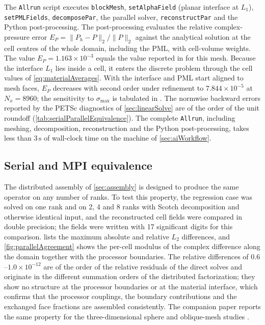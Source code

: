 \documentclass[final,12pt,nopreprintline]{elsarticle}
\newcommand{\code}[1]{\texttt{#1}}
\begin{document}
The \code{Allrun} script executes \code{blockMesh}, \code{setAlphaField}
(planar interface at $L_1$), \code{setPMLFields}, \code{decomposePar}, the
parallel solver, \code{reconstructPar} and the Python post-processing.  The
post-processing evaluates the relative complex-pressure error
$E_P=\|P_h-P\|_2/\|P\|_2$ against the analytical solution at the cell
centres of the whole domain, including the PML, with cell-volume weights.
The value $E_P=1.163\times10^{-3}$ equals the value reported in
\cite{Xu2026HelmholtzPML} for this mesh.  Because the interface $L_1$ lies
inside a cell, it enters the discrete problem through the cell values of
\cref{eq:materialAverages}.  With the interface and PML start aligned to mesh
faces, $E_P$ decreases with second order under refinement to
$7.844\times10^{-5}$ at $N_x=8960$; the sensitivity to $\sigma_{\max}$ is
tabulated in \cite{Xu2026HelmholtzPML}.
The normwise backward errors reported by the PETSc diagnostics of
\cref{sec:linearSolve} are of the order of the unit roundoff
(\cref{tab:serialParallelEquivalence}).
The complete \code{Allrun}, including meshing, decomposition,
reconstruction and the Python post-processing, takes less than
$3\,\mathrm{s}$ of wall-clock time on the machine of \cref{sec:aiWorkflow}.

\subsection{Serial and MPI equivalence}
\label{sec:parallelEquivalence}

The distributed assembly of \cref{sec:assembly} is designed to produce the
same operator on any number of ranks.  To test this property, the regression
case was solved on one rank and on 2, 4 and 8 ranks with Scotch decomposition
and otherwise identical input, and the reconstructed cell fields were compared
in double precision; the fields were written with 17 significant digits for
this comparison.
 lists the maximum absolute and relative
$L_2$ differences, and \cref{fig:parallelAgreement} shows the per-cell
modulus of the complex difference along the domain together with the
processor boundaries.  The relative differences of $0.6$--$1.0\times10^{-12}$
are of the order of the relative residuals of the direct solves and originate
in the different summation orders of the distributed factorization; they show
no structure at the processor boundaries or at the material interface, which
confirms that the processor couplings, the boundary contributions and the
exchanged face fractions are assembled consistently.  The companion paper
reports the same property for the three-dimensional sphere and oblique-mesh
studies \cite{Xu2026HelmholtzPML}.
\end{document}
